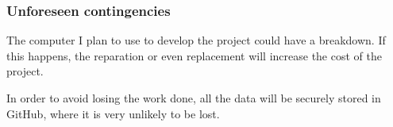 \documentclass[a4paper]{article}
\begin{document}



            \subsubsection*{Unforeseen contingencies}

            The computer I plan to use to develop the project could have a breakdown. If this happens, the reparation or even replacement will increase the cost of the project.

            In order to avoid losing the work done, all the data will be securely stored in GitHub, where it is very unlikely to be lost.
\end{document}

